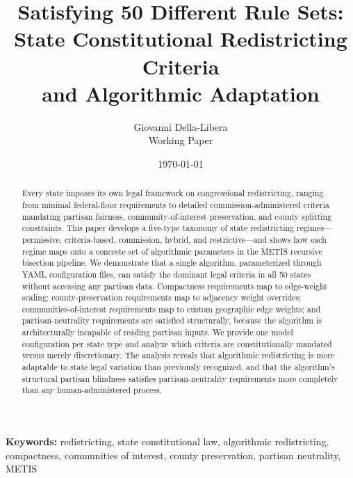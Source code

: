 \documentclass[12pt]{article}
\title{Satisfying 50 Different Rule Sets:\\
State Constitutional Redistricting Criteria\\
and Algorithmic Adaptation}
\author{
Giovanni Della-Libera\\
\small{Working Paper}
}
\date{\today}
\begin{document}
\maketitle

\begin{abstract}
Every state imposes its own legal framework on congressional redistricting, ranging from minimal federal-floor requirements to detailed commission-administered criteria mandating partisan fairness, community-of-interest preservation, and county splitting constraints. This paper develops a five-type taxonomy of state redistricting regimes---permissive, criteria-based, commission, hybrid, and restrictive---and shows how each regime maps onto a concrete set of algorithmic parameters in the METIS recursive bisection pipeline. We demonstrate that a single algorithm, parameterized through YAML configuration files, can satisfy the dominant legal criteria in all 50 states without accessing any partisan data. Compactness requirements map to edge-weight scaling; county-preservation requirements map to adjacency weight overrides; communities-of-interest requirements map to custom geographic edge weights; and partisan-neutrality requirements are satisfied structurally, because the algorithm is architecturally incapable of reading partisan inputs. We provide one model configuration per state type and analyze which criteria are constitutionally mandated versus merely discretionary. The analysis reveals that algorithmic redistricting is more adaptable to state legal variation than previously recognized, and that the algorithm's structural partisan blindness satisfies partisan-neutrality requirements more completely than any human-administered process.
\end{abstract}

\noindent\textbf{Keywords:} redistricting, state constitutional law, algorithmic redistricting, compactness, communities of interest, county preservation, partisan neutrality, METIS










\end{document}
